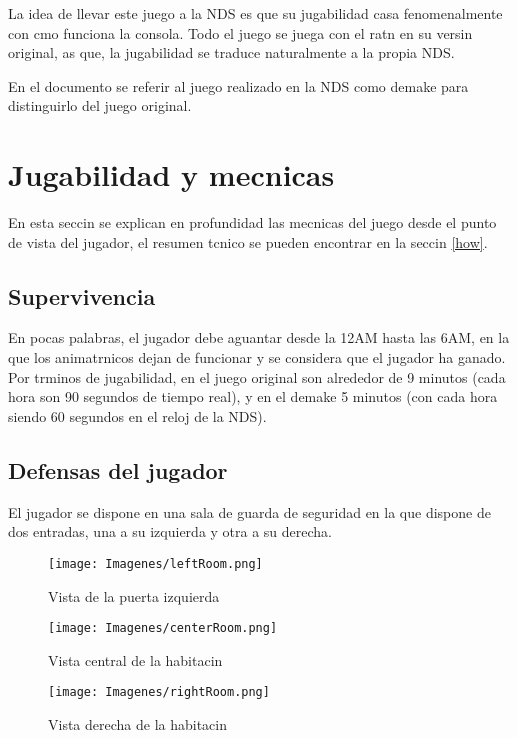 \documentclass[12pt]{article}
\begin{document}
  La idea de llevar este juego a la NDS es que su jugabilidad casa fenomenalmente con cmo funciona la consola. Todo el juego se juega con el ratn en su versin original, as que, la jugabilidad se traduce naturalmente a la propia NDS.

  En el documento se referir al juego realizado en la NDS como demake para distinguirlo del juego original.

\newpage
\section{Jugabilidad y mecnicas}
  En esta seccin se explican en profundidad las mecnicas del juego desde el punto de vista del jugador, el resumen tcnico se pueden encontrar en la seccin \ref{how}.

  \subsection{Supervivencia}

    En pocas palabras, el jugador debe aguantar desde la 12AM hasta las 6AM, en la que los animatrnicos dejan de funcionar y se considera que el jugador ha ganado. Por trminos de jugabilidad, en el juego original son alrededor de 9 minutos (cada hora son 90 segundos de tiempo real), y en el demake 5 minutos (con cada hora siendo 60 segundos en el reloj de la NDS).

  \subsection{Defensas del jugador}
    El jugador se dispone en una sala de guarda de seguridad en la que dispone de dos entradas, una a su izquierda y otra a su derecha.

    \begin{figure}[!h]
      \begin{minipage}[c]{0.3\linewidth}
        \centering
        \texttt{[image: Imagenes/leftRoom.png]}
        \caption{Vista de la puerta izquierda}
      \end{minipage}\:
      \begin{minipage}[c]{0.3\linewidth}
        \centering
        \texttt{[image: Imagenes/centerRoom.png]}
        \caption{Vista central de la habitacin}
      \end{minipage}\:
      \begin{minipage}[c]{0.3\linewidth}
        \centering
        \texttt{[image: Imagenes/rightRoom.png]}
        \caption{Vista derecha de la habitacin}
      \end{minipage}
    \end{figure}
\end{document}
